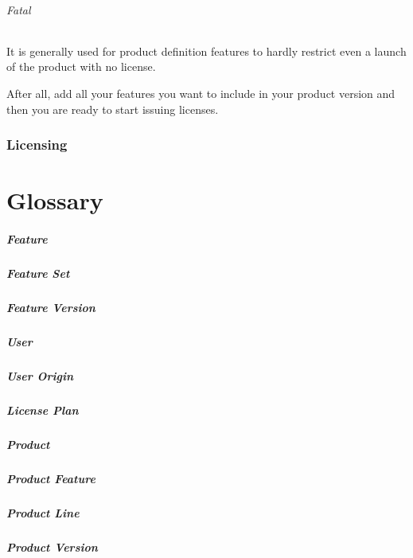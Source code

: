 \documentclass[12pt]{report}
\begin{document}
\subparagraph*{Fatal}
It is generally used for product definition features to hardly restrict even a launch of the product with no license.

After all, add all your features you want to include in your product version and then you are ready to start issuing licenses.

\subsection*{Licensing}



\chapter*{Glossary}

\paragraph*{Feature}

\paragraph*{Feature Set}

\paragraph*{Feature Version}

\paragraph*{User}

\paragraph*{User Origin}

\paragraph*{License Plan}

\paragraph*{Product}

\paragraph*{Product Feature}

\paragraph*{Product Line}

\paragraph*{Product Version}
\end{document}
